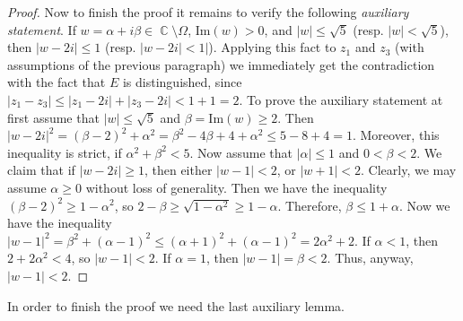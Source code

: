 \documentclass{amsart}
\numberwithin{equation}{section}
\theoremstyle{definition}
\theoremstyle{remark}
\DeclareMathOperator{\CC}{\mathbb C}
\begin{document}
\begin{proof}
		Now to finish the proof it remains to verify the following {\it{auxiliary statement}}. If $w = \alpha + i\beta \in \CC \setminus \Omega$, $\mathrm{Im}(w) > 0$, and $|w| \le \sqrt{5}$ (resp. $|w| < \sqrt{5}$), then $|w - 2i| \le 1$ (resp. $|w - 2i| < 1|$). Applying this fact to $z_1$ and $z_3$ (with assumptions of the previous paragraph) we immediately get the contradiction with the fact that $E$ is distinguished, since $|z_1 - z_3| \le |z_1 - 2i| + |z_3 - 2i| < 1 + 1 = 2$. To prove the auxiliary statement at first assume that $|w| \le \sqrt{5}$ and $\beta = \mathrm{Im}(w) \ge 2$. Then $|w - 2i|^2 = (\beta - 2)^2 + \alpha^2 = \beta^2 - 4\beta + 4 + \alpha^2 \le 5 - 8 + 4 = 1$. Moreover, this inequality is strict, if $\alpha^2 + \beta^2 < 5$. Now assume that $|\alpha| \le 1$ and $0 < \beta < 2$. We claim that if $|w - 2i| \ge 1$, then either $|w - 1| < 2$, or $|w + 1| < 2$. Clearly, we may assume $\alpha \ge 0$ without loss of generality. Then we have the inequality $(\beta - 2)^2 \ge 1 - \alpha^2$, so $2 - \beta \ge \sqrt{1 - \alpha^2} \ge 1 - \alpha$. Therefore, $\beta \le 1 + \alpha$. Now we have the inequality $|w - 1|^2 = \beta^2 + (\alpha - 1)^2 \le (\alpha + 1)^2 + (\alpha - 1)^2 = 2\alpha^2 + 2$. If $\alpha < 1$, then $2 + 2\alpha^2 < 4$, so $|w - 1| < 2$. If $\alpha = 1$, then $|w - 1| = \beta < 2$. Thus, anyway, $|w - 1| < 2$.
	\end{proof}

	In order to finish the proof we need the last auxiliary lemma.
	
\end{document}
